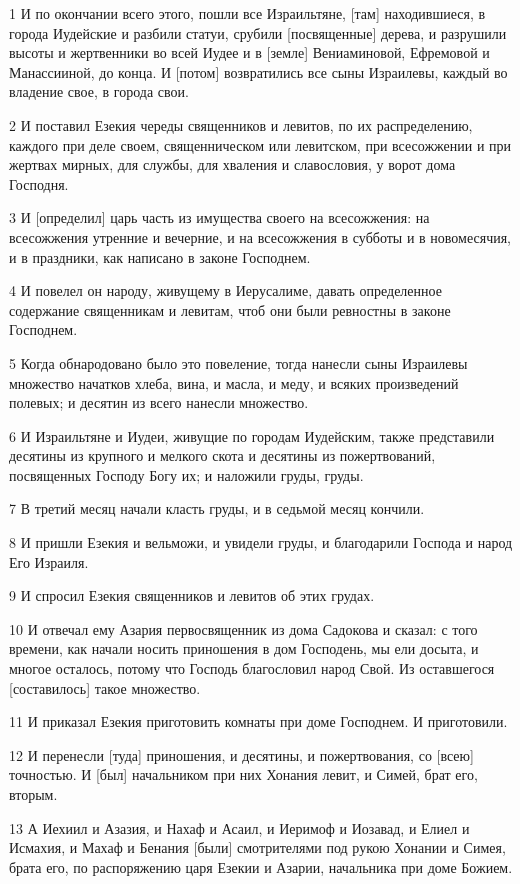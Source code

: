 \par 1 И по окончании всего этого, пошли все Израильтяне, [там] находившиеся, в города Иудейские и разбили статуи, срубили [посвященные] дерева, и разрушили высоты и жертвенники во всей Иудее и в [земле] Вениаминовой, Ефремовой и Манассииной, до конца. И [потом] возвратились все сыны Израилевы, каждый во владение свое, в города свои.
\par 2 И поставил Езекия череды священников и левитов, по их распределению, каждого при деле своем, священническом или левитском, при всесожжении и при жертвах мирных, для службы, для хваления и славословия, у ворот дома Господня.
\par 3 И [определил] царь часть из имущества своего на всесожжения: на всесожжения утренние и вечерние, и на всесожжения в субботы и в новомесячия, и в праздники, как написано в законе Господнем.
\par 4 И повелел он народу, живущему в Иерусалиме, давать определенное содержание священникам и левитам, чтоб они были ревностны в законе Господнем.
\par 5 Когда обнародовано было это повеление, тогда нанесли сыны Израилевы множество начатков хлеба, вина, и масла, и меду, и всяких произведений полевых; и десятин из всего нанесли множество.
\par 6 И Израильтяне и Иудеи, живущие по городам Иудейским, также представили десятины из крупного и мелкого скота и десятины из пожертвований, посвященных Господу Богу их; и наложили груды, груды.
\par 7 В третий месяц начали класть груды, и в седьмой месяц кончили.
\par 8 И пришли Езекия и вельможи, и увидели груды, и благодарили Господа и народ Его Израиля.
\par 9 И спросил Езекия священников и левитов об этих грудах.
\par 10 И отвечал ему Азария первосвященник из дома Садокова и сказал: с того времени, как начали носить приношения в дом Господень, мы ели досыта, и многое осталось, потому что Господь благословил народ Свой. Из оставшегося [составилось] такое множество.
\par 11 И приказал Езекия приготовить комнаты при доме Господнем. И приготовили.
\par 12 И перенесли [туда] приношения, и десятины, и пожертвования, со [всею] точностью. И [был] начальником при них Хонания левит, и Симей, брат его, вторым.
\par 13 А Иехиил и Азазия, и Нахаф и Асаил, и Иеримоф и Иозавад, и Елиел и Исмахия, и Махаф и Бенания [были] смотрителями под рукою Хонании и Симея, брата его, по распоряжению царя Езекии и Азарии, начальника при доме Божием.
